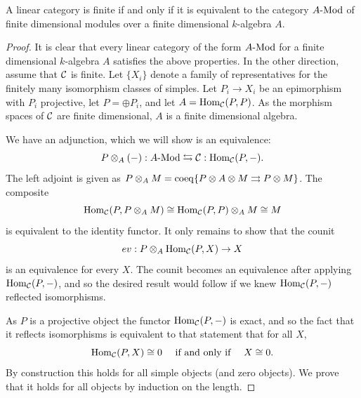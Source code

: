 \documentclass{amsart}
\begin{document}
\begin{proposition}
A linear category is finite if and only if it is equivalent to the category $\Mod{A}{}$ of finite dimensional modules over a finite dimensional $k$-algebra $A$.
\end{proposition}
\begin{proof}
	It is clear that every linear category of the form $\Mod{A}{}$ for a finite dimensional $k$-algebra $A$ satisfies the above properties. %
	In the other direction, assume that $\mathcal C$ is finite. Let $\{X_i\}$ denote a family of representatives for the finitely many isomorphism classes of simples. Let $P_i \to X_i$ be an epimorphism with $P_i$ projective, let $P = \oplus P_i$, and let $A = \operatorname{Hom}_{\mathcal C}(P,P)$. As the morphism spaces of $\mathcal C$ are finite dimensional, $A$ is a finite dimensional algebra. 
	
	We have an adjunction, which we will show is an equivalence:
	\begin{equation*}
		P \otimes_A (-):\Mod{A}{} \leftrightarrows \cC: \Hom_{\cC}(P,-).
	\end{equation*}
	The left adjoint is given as $P \otimes_A M = \operatorname{coeq}\{ P \otimes A \otimes M \rightrightarrows P \otimes M\}$. 
The composite 
\begin{equation*}
	\operatorname{Hom}_{\mathcal C}(P, P \otimes_A M) \cong \operatorname{Hom}_{\mathcal C}(P, P) \otimes_A M \cong M
\end{equation*}
 is equivalent to the identity functor. It only remains to show that the counit 
\begin{equation*}
	ev:P \otimes_A \operatorname{Hom}_{\mathcal C}(P, X) \to X
\end{equation*}
is an equivalence for every $X$. The counit becomes an equivalence after applying $\operatorname{Hom}_{\mathcal C}(P,-)$, and so the desired result would follow if we knew $\operatorname{Hom}_{\mathcal C}(P,-)$ reflected isomorphisms. 

As $P$ is a projective object the functor $\operatorname{Hom}_{\mathcal C}(P,-)$ is exact, and so the fact that it reflects isomorphisms is equivalent to that statement that for all $X$, 
\begin{equation} \label{eqn:reflect_zero_objects}
	\operatorname{Hom}_{\mathcal C}(P,X) \cong 0 \quad \textrm{ if and only if } \quad X \cong 0.
\end{equation} 
By construction this holds for all simple objects (and zero objects). We prove that it holds for all objects by induction on the length. 


\end{proof}
\end{document}
